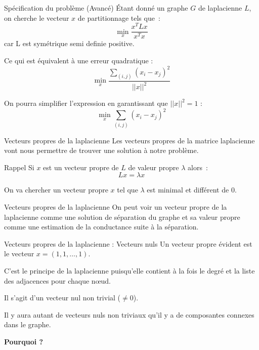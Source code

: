 \begin{frame}{Spécification du problème (Avancé)}
    Étant donné un graphe $G$ de laplacienne $L$, on cherche le vecteur $x$ de partitionnage tels que~:
    $$
        \min_{x} \frac{x^T L x}{x^T x}
    $$
    car L est symétrique semi definie positive.

    Ce qui est équivalent à une erreur quadratique :
    $$
        \min_x \frac{\sum_{(i,j)}(x_i-x_j)^2}{||x||^2}
    $$
    
    On pourra simplifier l'expression en garantissant que $||x||^2 = 1$ :
    $$
        \min_x \sum_{(i,j)}(x_i-x_j)^2
    $$
\end{frame}



\begin{frame}{Vecteurs propres de la laplacienne}
    Les vecteurs propres de la matrice laplacienne vont nous permettre de trouver une solution à notre problème.
    
    \begin{alertblock}{Rappel}
        Si $x$ est un vecteur propre de $L$ de valeur propre $\lambda$ alors~:
        $$
            Lx = \lambda x
        $$
    \end{alertblock} 

    On va chercher un vecteur propre $x$ tel que $\lambda$ est minimal et différent de 0.
\end{frame}

\begin{frame}{Vecteurs propres de la laplacienne}
    On peut voir un vecteur propre de la laplacienne comme une solution de séparation du graphe et sa valeur propre comme une estimation de la conductance suite à la séparation.
\end{frame}

\begin{frame}{Vecteurs propres de la laplacienne : Vecteurs nuls}
    Un vecteur propre évident est le vecteur $x=(1,1,\dots ,1 )$.
    
    C'est le principe de la laplacienne puisqu'elle contient à la fois le degré et la liste des adjacences pour chaque nœud.
    \vfill

    Il s'agit d'un vecteur nul non trivial ($\neq 0$).
    
    \alert{Il y aura autant de vecteurs nuls non triviaux qu'il y a de composantes connexes dans le graphe.}

    \centering \textbf{Pourquoi ?}
\end{frame}
 
